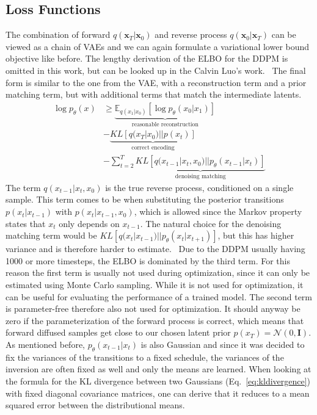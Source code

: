 \subsection{Loss Functions}
The combination of forward $q(\bm{x}_T|\bm{x}_0)$ and reverse process $q(\bm{x}_0|\bm{x}_T)$ can be viewed as a chain of VAEs and we can again formulate a variational lower bound objective like before. The lengthy derivation of the ELBO for the DDPM is omitted in this work, but can be looked up in the Calvin Luo's work.~\autocite{luo2022understanding} The final form is similar to the one from the VAE, with a reconstruction term and a prior matching term, but with additional terms that match the intermediate latents.
\begin{align}
    \log p_{\theta}(x) & \geq \underbrace{\mathbb{E}_{q(x_1|x_0)} \left[ \log p_{\theta}(x_0|x_1) \right]}_{\text{reasonable reconstruction}}          \\
                       & - \underbrace{KL \left[ q(x_T|x_0) || p(x_t) \right]}_{\text{correct encoding}}                                               \\
                       & - \sum_{t=2}^{T} \underbrace{KL \left[ q(x_{t-1}|x_{t},x_0) || p_{\theta}(x_{t-1}|x_{t}) \right]}_{\text{denoising matching}}
\end{align}
The term $q(x_{t-1}|x_{t},x_0)$ is the true reverse process, conditioned on a single sample. This term comes to be when substituting the posterior transitions $p(x_t|x_{t-1})$ with $p(x_t|x_{t-1}, x_0)$, which is allowed since the Markov property states that $x_t$ only depends on $x_{t-1}$. The natural choice for the denoising matching term would be $KL\left[ q(x_t|x_{t-1}) || p_{\theta}(x_t|x_{t+1}) \right]$, but this has higher variance and is therefore harder to estimate.~\autocite{ho2020denoising} Due to the DDPM usually having 1000 or more timesteps, the ELBO is dominated by the third term. For this reason the first term is usually not used during optimization, since it can only be estimated using Monte Carlo sampling. While it is not used for optimization, it can be useful for evaluating the performance of a trained model. The second term is parameter-free therefore also not used for optimization. It should anyway be zero if the parameterization of the forward process is correct, which means that forward diffused samples get close to our chosen latent prior $p(x_T) = \mathcal{N}(0,\bm{I})$. As mentioned before, $p_{\theta}(x_{t-1}|x_t)$ is also Gaussian and since it was decided to fix the variances of the transitions to a fixed schedule, the variances of the inversion are often fixed as well and only the means are learned. When looking at the formula for the KL divergence between two Gaussians (Eq.~\ref{eq:kldivergence}) with fixed diagonal covariance matrices, one can derive that it reduces to a mean squared error between the distributional means.~\autocite{luo2022understanding}
